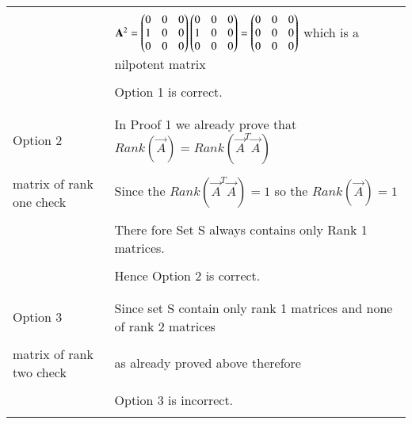 \documentclass[journal,12pt]{IEEEtran}
\begin{document}
\begin{longtable}{|l|l|}
    &\\
    &$\mathbf{A}^2=\begin{pmatrix}0&0&0\\1&0&0\\0&0&0\end{pmatrix}\begin{pmatrix}0&0&0\\1&0&0\\0&0&0\end{pmatrix}=\begin{pmatrix}0&0&0\\0&0&0\\0&0&0\end{pmatrix}$ which is a nilpotent matrix\\
    &\\
    &Option 1 is correct.\\
    &\\
    \hline
	\multirow{3}{*}{Option 2}
	& \\
    &In Proof 1 we already prove that $Rank(\vec{A})=Rank(\vec{A}^T\vec{A})$\\
    &\\
    matrix of rank one check &Since the $Rank(\vec{A}^T\vec{A})=1$ so the $Rank(\vec{A})=1$ \\ 
	&\\
	&There fore Set S always contains only Rank 1 matrices.\\
	&\\
	&Hence Option 2 is correct.\\
	&\\
	\hline
	\multirow{3}{*}{Option 3}
	&\\
    &Since set S contain only rank 1 matrices and none of rank 2 matrices \\
    &\\
    matrix of rank two check&as already proved above therefore\\
    &\\
    &Option 3 is incorrect.\\
    &\\
    

\end{longtable}
\end{document}
